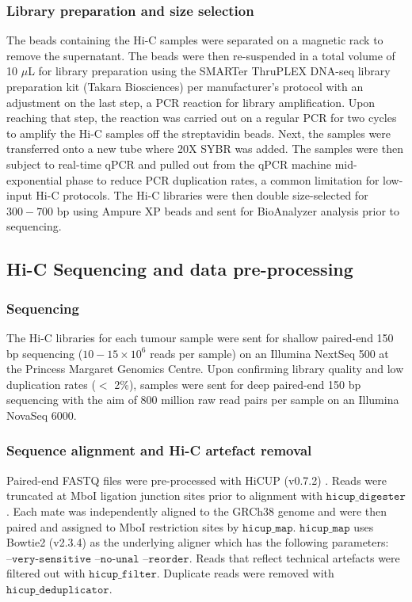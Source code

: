 \subsubsection{Library preparation and size selection}

The beads containing the Hi-C samples were separated on a magnetic rack to remove the supernatant.
The beads were then re-suspended in a total volume of 10 $\mu$L for library preparation using the SMARTer ThruPLEX DNA-seq library preparation kit (Takara Biosciences) per manufacturer's protocol with an adjustment on the last step, a PCR reaction for library amplification.
Upon reaching that step, the reaction was carried out on a regular PCR for two cycles to amplify the Hi-C samples off the streptavidin beads.
Next, the samples were transferred onto a new tube where 20X SYBR was added.
The samples were then subject to real-time qPCR and pulled out from the qPCR machine mid-exponential phase to reduce PCR duplication rates, a common limitation for low-input Hi-C protocols.
The Hi-C libraries were then double size-selected for $300-700$ bp using Ampure XP beads and sent for BioAnalyzer analysis prior to sequencing.

\subsection{Hi-C Sequencing and data pre-processing}

\subsubsection{Sequencing}

The Hi-C libraries for each tumour sample were sent for shallow paired-end 150 bp sequencing (\textapprox $10-15 \times 10^6$ reads per sample) on an Illumina NextSeq 500 at the Princess Margaret Genomics Centre.
Upon confirming library quality and low duplication rates ($<$ 2\%), samples were sent for deep paired-end 150 bp sequencing with the aim of 800 million raw read pairs per sample on an Illumina NovaSeq 6000.

\subsubsection{Sequence alignment and Hi-C artefact removal}

Paired-end FASTQ files were pre-processed with HiCUP (v0.7.2) \cite{wingettHiCUPPipelineMapping2015}.
Reads were truncated at MboI ligation junction sites prior to alignment with $\texttt{hicup\_digester}$.
Each mate was independently aligned to the GRCh38 genome and were then paired and assigned to MboI restriction sites by $\texttt{hicup\_map}$.
$\texttt{hicup\_map}$ uses Bowtie2 (v2.3.4) \cite{langmeadFastGappedreadAlignment2012} as the underlying aligner which has the following parameters: $\texttt{--very-sensitive --no-unal --reorder}$.
Reads that reflect technical artefacts were filtered out with $\texttt{hicup\_filter}$.
Duplicate reads were removed with $\texttt{hicup\_deduplicator}$.

